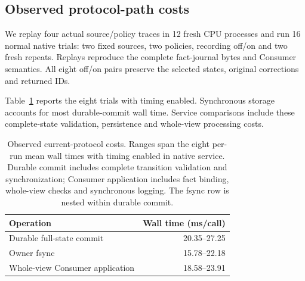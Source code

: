 \subsection{Observed protocol-path costs}
\label{subsec:protocol_cost}
We replay four actual source/policy traces in 12 fresh CPU processes and
run 16 normal native trials: two fixed sources, two policies, recording
off/on and two fresh repeats. Replays reproduce the complete fact-journal
bytes and Consumer semantics. All eight off/on pairs preserve the selected
states, original corrections and returned IDs.

Table~\ref{tab:protocol_cost} reports the eight trials with timing enabled.
Synchronous storage accounts for most durable-commit wall time. Service
comparisons include these complete-state validation, persistence and
whole-view processing costs.

\begin{table}[t]
\centering
\caption{Observed current-protocol costs. Ranges span the eight per-run
mean wall times with timing enabled in native service. Durable commit includes
complete transition validation and synchronization; Consumer application
includes fact binding, whole-view checks and synchronous logging.
The fsync row is nested within durable commit.}
\label{tab:protocol_cost}
\small\setlength{\tabcolsep}{4pt}
\begin{tabular}{@{}lr@{}}
\toprule
Operation & Wall time (ms/call)\\
\midrule
Durable full-state commit & 20.35--27.25\\
\quad Owner fsync & 15.78--22.18\\
Whole-view Consumer application & 18.58--23.91\\
\bottomrule
\end{tabular}
\end{table}
